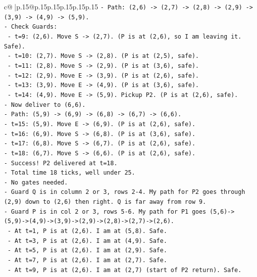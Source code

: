 \documentclass{article}
\begin{document}
{\begin{supertabular}{c@{$\;$}|p{.15\linewidth}@{}p{.15\linewidth}p{.15\linewidth}p{.15\linewidth}p{.15\linewidth}p{.15\linewidth}}
{{{\texttt{{-} Path: (2,6) {-}> (2,7) {-}> (2,8) {-}> (2,9) {-}> (3,9) {-}> (4,9) {-}> (5,9).} \\
\texttt{{-} Check Guards:} \\
\texttt{  {-} t=9: (2,6). Move S {-}> (2,7). (P is at (2,6), so I am leaving it. Safe).} \\
\texttt{  {-} t=10: (2,7). Move S {-}> (2,8). (P is at (2,5), safe).} \\
\texttt{  {-} t=11: (2,8). Move S {-}> (2,9). (P is at (3,6), safe).} \\
\texttt{  {-} t=12: (2,9). Move E {-}> (3,9). (P is at (2,6), safe).} \\
\texttt{  {-} t=13: (3,9). Move E {-}> (4,9). (P is at (3,6), safe).} \\
\texttt{  {-} t=14: (4,9). Move E {-}> (5,9). Pickup P2. (P is at (2,6), safe).} \\
\texttt{{-} Now deliver to (6,6).} \\
\texttt{{-} Path: (5,9) {-}> (6,9) {-}> (6,8) {-}> (6,7) {-}> (6,6).} \\
\texttt{{-} t=15: (5,9). Move E {-}> (6,9). (P is at (2,6), safe).} \\
\texttt{{-} t=16: (6,9). Move S {-}> (6,8). (P is at (3,6), safe).} \\
\texttt{{-} t=17: (6,8). Move S {-}> (6,7). (P is at (2,6), safe).} \\
\texttt{{-} t=18: (6,7). Move S {-}> (6,6). (P is at (2,6), safe).} \\
\texttt{{-} Success! P2 delivered at t=18.} \\
\texttt{{-} Total time 18 ticks, well under 25.} \\
\texttt{{-} No gates needed.} \\
\texttt{{-} Guard Q is in column 2 or 3, rows 2{-}4. My path for P2 goes through (2,9) down to (2,6) then right. Q is far away from row 9.} \\
\texttt{{-} Guard P is in col 2 or 3, rows 5{-}6. My path for P1 goes (5,6){-}>(5,9){-}>(4,9){-}>(3,9){-}>(2,9){-}>(2,8){-}>(2,7){-}>(2,6).} \\
\texttt{  {-} At t=1, P is at (2,6). I am at (5,8). Safe.} \\
\texttt{  {-} At t=3, P is at (2,6). I am at (4,9). Safe.} \\
\texttt{  {-} At t=5, P is at (2,6). I am at (2,9). Safe.} \\
\texttt{  {-} At t=7, P is at (2,6). I am at (2,7). Safe.} \\
\texttt{  {-} At t=9, P is at (2,6). I am at (2,7) (start of P2 return). Safe.} \\
}}}
\end{supertabular}}
\end{document}
